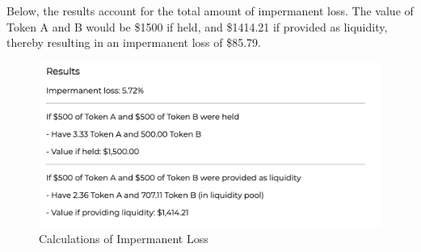 \documentclass[12pt]{article}
\begin{document}
Below, the results account for the total amount of impermanent loss. The value of Token A and B would be \$1500 if held, and \$1414.21 if provided as liquidity, thereby resulting in an impermanent loss of \$85.79.

\begin{figure}[H]
    \centering
    \includegraphics[width=0.6\linewidth]{results.png}
    \caption{Calculations of Impermanent Loss}
    \label{fig:calculations}
\end{figure}
\end{document}
